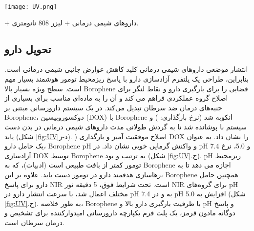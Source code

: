 \begin{figure*}
    \centering
    \texttt{[image: UV.png]}
    \caption{الف) طیف . ب) مشخصات تغییر دما  تحت لیزر 808 نانومتر. ج) رابطه خطی بین $\ln\theta$ و زمان. د) مشخصات گرمایش  پس از پنج سیکل. ه) اسکن تصاویر میکروسکوپ الکترونی عبوری–EDS از . و) طیف UV بارگیری بوروفین با DOX. ز) توانایی بوروفین برای بارگیری داروهای شیمی درمانی. ح) منحنی های DOX را تحت pH های مختلف آزاد کنید. ی-ن) آزمایشات سلولی. ی) ارزیابی ایمنی بوروفین در سلول های مختلف (بدون لیزر). ک) ارزیابی سمیت بوروفین در سلول های مختلف (لیزر 808 نانومتر). ل) زنده ماندن نسبی سلول های تومور تحت درمان های مختلف. م) تصاویر CLSM از سلول های تومور رنگ شده با PI (مرده، قرمز) و AM (زنده، سبز). ن) عکسهای دیجیتالی موشها و تومورهای معرف در گروههای مختلف تحت درمان به مدت 14 روز. ن) وزن بدن موش‌ها. G1: کنترل؛ G2: داروهای شیمی درمانی. G3: بوروفین + داروهای شیمی درمانی. G 4: بوروفین + لیزر 808 نانومتری. G5: بوروفین} + داروهای شیمی درمانی + لیزر 808 نانومتری.
    \label{fig:UV}
\end{figure*}

\subsection{تحویل دارو }
انتشار موضعی داروهای شیمی درمانی کلید کاهش عوارض جانبی شیمی درمانی است. بنابراین، طراحی یک پلتفرم آزادسازی دارو با پاسخ ریزمحیط تومور هوشمند بسیار مهم است. سطح ویژه بسیار بالا \gls{Borophene} فضایی را برای بارگیری دارو و نقاط لنگر برای اصلاح گروه عملکردی فراهم می کند و آن را به ماده‌ای مناسب برای بسیاری از جنبه‌های درمان ضد سرطان تبدیل می‌کند. در یک سیستم دارورسانی مبتنی بر \gls{Borophene}، دوکسوروبیسین (\gls{DOX}) با \gls{Borophene} انکوبه شد (نرخ بارگذاری: ) و سیستم با  پوشانده شد تا به گردش طولانی مدت داروهای شیمی درمانی در بدن دست یابد (شکل \ref{fig:UV}د-ز). ) اصلاح موفقیت آمیز  و بارگذاری \gls{DOX} را نشان داد.\cite{jiNovelTopDownSynthesis2018} به عنوان یک حامل دارو، \gls{Borophene} \gls{pH} و واکنش گرمایی خوبی نشان داد. در \gls{pH} 7.4 و 5.0، نرخ آزادسازی \gls{DOX} توسط \gls{Borophene} به ترتیب  و  بود (شکل \ref{fig:UV}.ح). \gls{pH} ریزمحیط تومور کمتر از بافت طبیعی است (ادبیات)، که به \gls{Borophene} اجازه می دهد تا به رهاسازی هدفمند دارو در تومور دست یابد. علاوه بر این، \gls{Borophene} همچنین حامل دارو برای پاسخ \gls{NIR} است. تحت شرایط فوق، 5 دقیقه نور \gls{NIR} برای گروه‌های \gls{pH} مختلف اعمال شد، با سرعت انتشار دارو در \gls{pH} 7.4 به  و در \gls{pH} 5.0 افزایش به  (شکل \ref{fig:UV}.ح). به طور خلاصه، \gls{Borophene} با ظرفیت بارگیری دارو بالا و \gls{pH} و پاسخ دوگانه مادون قرمز، یک پلت فرم یکپارچه دارورسانی امیدوارکننده برای تشخیص و درمان سرطان است.

